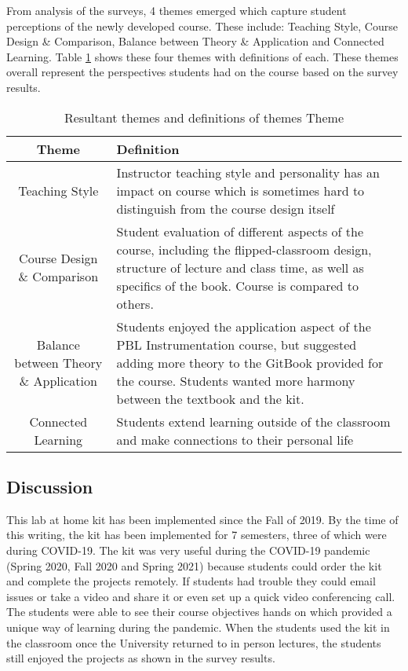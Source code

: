 From analysis of the surveys, 4 themes emerged which capture student
perceptions of the newly developed course. These include: Teaching
Style, Course Design \& Comparison, Balance between Theory \&
Application and Connected Learning. Table \ref{t:themes} shows these
four themes with definitions of each. These themes overall represent
the perspectives students had on the course based on the survey
results. 

\begin{table}[H]
\centering
\begin{tabular}{|c|p{9cm}|}
\hline
{\bf Theme} & {\bf Definition} \\
\hline
\hline
Teaching Style & Instructor teaching style and personality has an impact on course which is sometimes hard to distinguish from the course design itself \\
\hline
Course Design \& Comparison & Student evaluation of different aspects of the course, including the flipped-classroom design, structure of lecture and class time, as well as specifics of the book. Course is compared to others.\\
\hline
Balance between Theory \& Application & Students enjoyed the application aspect of the PBL Instrumentation course, but suggested adding more theory to the GitBook provided for the course. Students wanted more harmony between the textbook and the kit. \\
\hline
Connected Learning & Students extend learning outside of the classroom and make connections to their personal life \\
\hline
\end{tabular}
\caption{Resultant themes and definitions of themes
Theme}\label{t:themes}
\end{table}

\subsection{Discussion}

This lab at home kit has been implemented since the Fall of 2019. By
the time of this writing, the kit has been implemented for 7
semesters, three of which were during COVID-19. The kit was very
useful during the COVID-19 pandemic (Spring 2020, Fall 2020 and Spring
2021) because students could order the kit and complete the projects
remotely. If students had trouble they could email issues or take a
video and share it or even set up a quick video conferencing call. The
students were able to see their course objectives hands on which
provided a unique way of learning during the pandemic. When the
students used the kit in the classroom once the University returned to
in person lectures, the students still enjoyed the projects as shown
in the survey results. 

